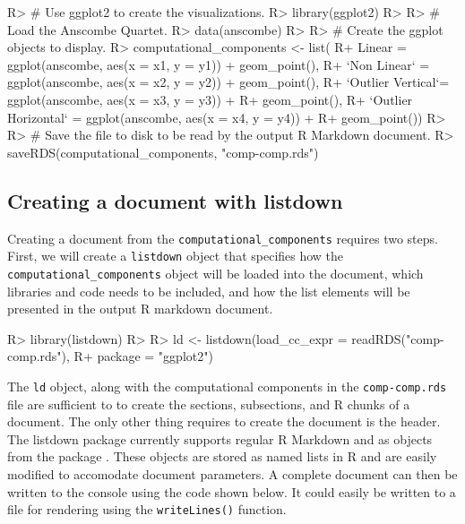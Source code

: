 \documentclass[
]{jss}
\begin{document}
\begin{CodeChunk}

\begin{CodeInput}
R> # Use ggplot2 to create the visualizations.
R> library(ggplot2)
R> 
R> # Load the Anscombe Quartet.
R> data(anscombe)
R> 
R> # Create the ggplot objects to display.
R>   computational_components <- list(
R+     Linear = ggplot(anscombe, aes(x = x1, y = y1)) + geom_point(),
R+     `Non Linear` = ggplot(anscombe, aes(x = x2, y = y2)) + geom_point(),
R+     `Outlier Vertical`= ggplot(anscombe, aes(x = x3, y = y3)) + 
R+       geom_point(),
R+     `Outlier Horizontal` =  ggplot(anscombe, aes(x = x4, y = y4)) + 
R+       geom_point())
R> 
R> # Save the file to disk to be read by the output R Markdown document.
R> saveRDS(computational_components, "comp-comp.rds")
\end{CodeInput}
\end{CodeChunk}

\hypertarget{creating-a-document-with-listdown}{%
\subsection{Creating a document with
listdown}\label{creating-a-document-with-listdown}}

Creating a document from the \texttt{computational\_components} requires
two steps. First, we will create a \texttt{listdown} object that
specifies how the \texttt{computational\_components} object will be
loaded into the document, which libraries and code needs to be included,
and how the list elements will be presented in the output R markdown
document.

\begin{CodeChunk}

\begin{CodeInput}
R> library(listdown)
R> 
R> ld <- listdown(load_cc_expr = readRDS("comp-comp.rds"),
R+                package = "ggplot2")
\end{CodeInput}
\end{CodeChunk}

The \texttt{ld} object, along with the computational components in the
\texttt{comp-comp.rds} file are sufficient to to create the sections,
subsections, and R chunks of a document. The only other thing requires
to create the document is the header. The listdown package currently
supports regular R Markdown and  as  objects
from the  package \citep{yaml}. These objects are stored as
named lists in R and are easily modified to accomodate document
parameters. A complete document can then be written to the console using
the code shown below. It could easily be written to a file for rendering
using the \texttt{writeLines()} function.
\end{document}

